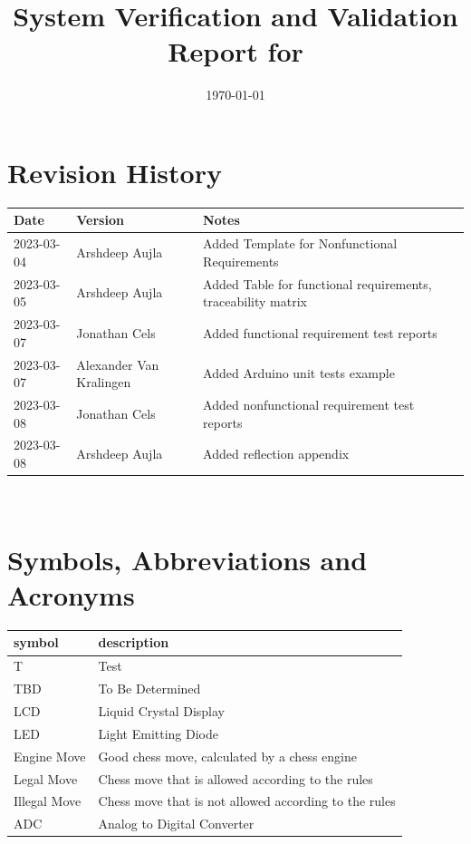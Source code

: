 \documentclass[12pt, titlepage]{article}
\begin{document}
\title{System Verification and Validation Report for \progname{}} 
\author{\authname}
\date{\today}
	
\maketitle


\section{Revision History}

\begin{tabularx}{\textwidth}{p{3cm}p{2cm}X}
\toprule {\bf Date} & {\bf Version} & {\bf Notes}\\
\midrule
2023-03-04 & Arshdeep Aujla & Added Template for Nonfunctional Requirements\\
2023-03-05 & Arshdeep Aujla & Added Table for functional requirements, traceability matrix\\
2023-03-07 & Jonathan Cels & Added functional requirement test reports\\
2023-03-07 & Alexander Van Kralingen & Added Arduino unit tests example\\
2023-03-08 & Jonathan Cels & Added nonfunctional requirement test reports\\
2023-03-08 & Arshdeep Aujla & Added reflection appendix\\
\bottomrule
\end{tabularx}

~\newpage

\section{Symbols, Abbreviations and Acronyms}

\renewcommand{\arraystretch}{1.2}
\begin{tabular}{l l} 
    \toprule		
    \textbf{symbol} & \textbf{description}\\
    \midrule 
    T & Test\\
    TBD & To Be Determined\\
    LCD & Liquid Crystal Display\\
    LED & Light Emitting Diode\\
    Engine Move & Good chess move, calculated by a chess engine\\
    Legal Move & Chess move that is allowed according to the rules\\
    Illegal Move & Chess move that is not allowed according to the rules\\
    ADC & Analog to Digital Converter\\
  \bottomrule
\end{tabular}\\
\end{document}
